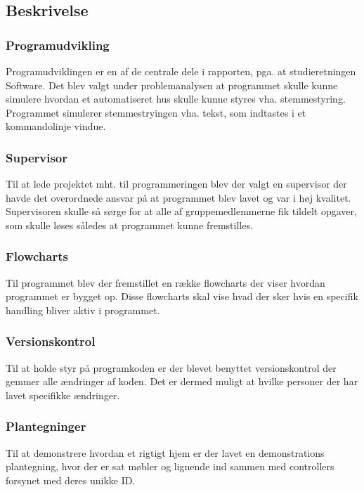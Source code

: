 \subsection{Beskrivelse}
\subsubsection{Programudvikling}
Programudviklingen er en af de centrale dele i rapporten, pga. at studieretningen Software. Det blev valgt under problemanalysen at programmet skulle kunne simulere hvordan et automatiseret hus skulle kunne styres vha. stemmestyring. Programmet simulerer stemmestryingen vha. tekst, som indtastes i et kommandolinje vindue.\\

\subsubsection{Supervisor}
Til at lede projektet mht. til programmeringen blev der valgt en supervisor der havde det overordnede ansvar på at programmet blev lavet og var i høj kvalitet. Supervisoren skulle så sørge for at alle af gruppemedlemmerne fik tildelt opgaver, som skulle løses således at programmet kunne fremstilles.\\

\subsubsection{Flowcharts}
Til programmet blev der fremstillet en række flowcharts der viser hvordan programmet er bygget op. Disse flowcharts skal vise hvad der sker hvis en specifik handling bliver aktiv i programmet.\\

\subsubsection{Versionskontrol}
Til at holde styr på programkoden er der blevet benyttet versionskontrol der gemmer alle ændringer af koden. Det er dermed muligt at hvilke personer der har lavet specifikke ændringer.\\

\subsubsection{Plantegninger}
Til at demonstrere hvordan et rigtigt hjem er der lavet en demonstrations plantegning, hvor der er sat møbler og lignende ind sammen med controllers forsynet med deres unikke ID.

